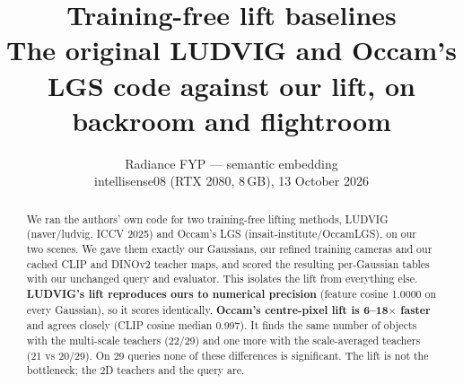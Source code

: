 \documentclass[11pt,a4paper]{article}
\title{\textbf{Training-free lift baselines}\\[2pt]
\large The original LUDVIG and Occam's LGS code against our lift, on backroom and flightroom}
\author{Radiance FYP --- semantic embedding\\ \small intellisense08 (RTX 2080, 8\,GB), 13 October 2026}
\date{}
\begin{document}
\maketitle

\begin{abstract}
\noindent We ran the authors' own code for two training-free lifting methods, LUDVIG (naver/ludvig, ICCV 2025) and
Occam's LGS (insait-institute/OccamLGS), on our two scenes. We gave them exactly our Gaussians, our refined training
cameras and our cached CLIP and DINOv2 teacher maps, and scored the resulting per-Gaussian tables with our unchanged
query and evaluator. This isolates the lift from everything else. \textbf{LUDVIG's lift reproduces ours to numerical
precision} (feature cosine 1.0000 on every Gaussian), so it scores identically. \textbf{Occam's centre-pixel lift is
6--18$\times$ faster} and agrees closely (CLIP cosine median 0.997). It finds the same number of objects with the
multi-scale teachers (22/29) and one more with the scale-averaged teachers (21 vs 20/29). On 29 queries none of these
differences is significant. The lift is not the bottleneck; the 2D teachers and the query are.
\end{abstract}

\tableofcontents
\bigskip

\end{document}

